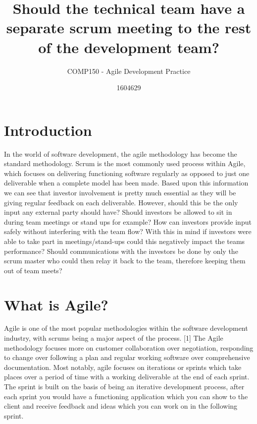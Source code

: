 \documentclass{scrartcl}
\title{Should the technical team have a separate scrum meeting to the rest of the development team?}
\subtitle{COMP150 - Agile Development Practice}
\author{1604629}
\begin{document}
\maketitle


\clearpage

\section{Introduction}

In the world of software development, the agile methodology has become the standard methodology. Scrum is the most commonly used process within Agile, which focuses on delivering functioning software regularly as opposed to just one deliverable when a complete model has been made. Based upon this information we can see that investor involvement is pretty much essential as they will be giving regular feedback on each deliverable. However, should this be the only input any external party should have? Should investors be allowed to sit in during team meetings or stand ups for example? How can investors provide input safely without interfering with the team flow? With this in mind if investors were able to take part in meetings/stand-ups could this negatively impact the teams performance? Should communications with the investors be done by only the scrum master who could then relay it back to the team, therefore keeping them out of team meets?

\section{What is Agile?}
Agile is one of the most popular methodologies within the software development industry, with scrums being a major aspect of the process. [1] The Agile methodology focuses more on customer collaboration over negotiation, responding to change over following a plan and regular working software over comprehensive documentation. Most notably, agile focuses on iterations or sprints which take places over a period of time with a working deliverable at the end of each sprint. The sprint is built on the basis of being an iterative development process, after each sprint you would have a functioning application which you can show to the client and receive feedback and ideas which you can work on in the following sprint.
\end{document}
